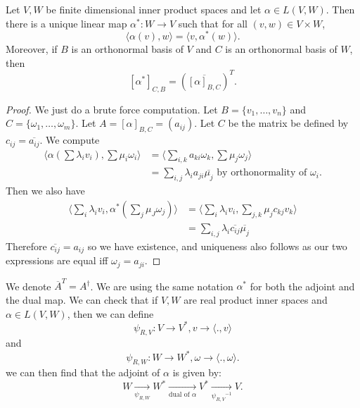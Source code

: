 \documentclass[a4paper]{scrartcl}
\begin{document}
\begin{definition}
      Let $V,W$ be finite dimensional inner product spaces and let $\alpha \in L (V,W)$. Then there is a unique linear map $\alpha^* : W \rightarrow V$ such that for all $(v,w) \in V \times W$, 
      \[\langle \alpha (v),w \rangle =\langle v,\alpha^* (w) \rangle .\]
      Moreover, if $B$ is an orthonormal basis of $V$ and $C$ is an orthonormal basis of $W$, then 
      \[[\alpha^*]_{C,B}=(\overline{[\alpha]_{B,C}} )^T.\]
\end{definition}
\begin{proof}
      We just do a brute force computation. Let $B =\{v_1, \ldots , v_n \} $ and $C= \{ \omega_1, \ldots , \omega_m\}$. Let $A=[\alpha]_{B,C}=(a_{ij})$. Let $C$ be the matrix be defined by $c_{ij}=\overline{a_{ij}} $. We compute 
      \begin{align*}
          \langle \alpha (\sum \lambda_i v_i), \sum \mu_i \omega_i \rangle &=\langle \sum_{i,k} a_{ki} \omega_k, \sum \mu_j \omega_j  \rangle \\
          &=\sum_{i,j} \lambda_i a_{ji} \overline{\mu_j} \text{ by orthonormality of } \omega_i.
      \end{align*}
      Then we also have 
      \begin{align*}
           \langle \sum_{i} \lambda_i v_i, \alpha^* \left( \sum_j \mu_J \omega_j \right) \rangle &=\langle \sum_{i} \lambda_i v_i, \sum_{j,k} \mu_j c_{kj}v_k \rangle \\&= \sum_{i,j}\lambda_i \overline{c_{ij}} \overline{\mu_j} 
      \end{align*}
      Therefore $\overline{c_{ij}} = a_{ij}$ so we have existence, and uniqueness also follows as our two expressions are equal iff $\omega_j=a_{ji}$.  
\end{proof}
\begin{remark}
      We denote $\overline{A} ^T=A^\dagger$. We are using the same notation $\alpha^*$ for both the adjoint and the dual map. We can check that if $V,W$ are real product inner spaces and $\alpha \in L (V,W)$, then we can define 
      \[\psi_{R,V}: V \rightarrow V^{*}, v \rightarrow \langle .,v \rangle\]
      and 
      \[\psi_{R,W}: W \rightarrow W^{*}, \omega \rightarrow \langle .,\omega \rangle.\]
      we can then find that the adjoint of $\alpha$ is given by: 
      \[W \underset{\psi_{R,W}}{\rightarrow }W^* \underset{\text{dual of } \alpha}{\rightarrow }V^* \underset{{\psi_{R,V}}^{-1}}{\rightarrow }V.\]
\end{remark}
\end{document}
